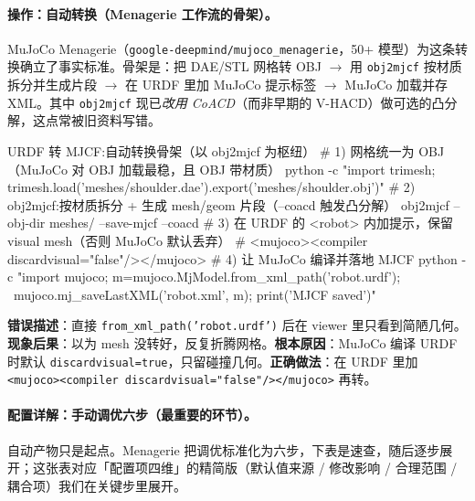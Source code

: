 \paragraph{操作：自动转换（Menagerie 工作流的骨架）。}MuJoCo Menagerie（\texttt{google-deepmind/\allowbreak mujoco\_menagerie}，50+ 模型）为这条转换确立了事实标准。骨架是：把 DAE/STL 网格转 OBJ $\to$ 用 \texttt{obj2mjcf} 按材质拆分并生成片段 $\to$ 在 URDF 里加 MuJoCo 提示标签 $\to$ MuJoCo 加载并存 XML。其中 \texttt{obj2mjcf} 现已\emph{改用 CoACD}（而非早期的 V-HACD）做可选的凸分解，这点常被旧资料写错。

\begin{codebox}[bash]{URDF 转 MJCF:自动转换骨架（以 obj2mjcf 为枢纽）}
# 1) 网格统一为 OBJ（MuJoCo 对 OBJ 加载最稳，且 OBJ 带材质）
python -c "import trimesh; trimesh.load('meshes/shoulder.dae').export('meshes/shoulder.obj')"
# 2) obj2mjcf:按材质拆分 + 生成 mesh/geom 片段（--coacd 触发凸分解）
obj2mjcf --obj-dir meshes/ --save-mjcf --coacd
# 3) 在 URDF 的 <robot> 内加提示，保留 visual mesh（否则 MuJoCo 默认丢弃）
#    <mujoco><compiler discardvisual="false"/></mujoco>
# 4) 让 MuJoCo 编译并落地 MJCF
python -c "import mujoco; m=mujoco.MjModel.from_xml_path('robot.urdf'); \
mujoco.mj_saveLastXML('robot.xml', m); print('MJCF saved')"
\end{codebox}

\begin{pitfall}
\textbf{错误描述}：直接 \texttt{from\_xml\_path('robot.\allowbreak urdf')} 后在 viewer 里只看到简陋几何。\textbf{现象后果}：以为 mesh 没转好，反复折腾网格。\textbf{根本原因}：MuJoCo 编译 URDF 时默认 \texttt{discardvisual=true}，只留碰撞几何。\textbf{正确做法}：在 URDF 里加 \texttt{<mujoco><compiler discardvisual="false"/\allowbreak ></\allowbreak mujoco>} 再转。
\end{pitfall}

\paragraph{配置详解：手动调优六步（最重要的环节）。}自动产物只是起点。Menagerie 把调优标准化为六步，下表是速查，随后逐步展开；这张表对应「配置项四维」的精简版（默认值来源 / 修改影响 / 合理范围 / 耦合项）我们在关键步里展开。

